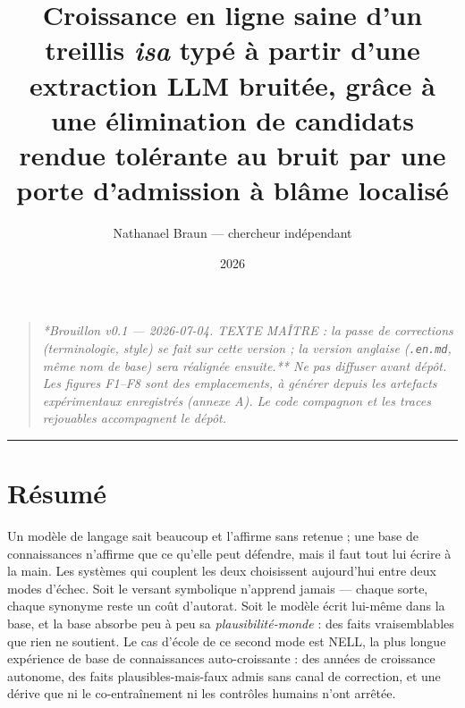 \documentclass[11pt]{article}
\title{\textbf{Croissance en ligne saine d'un treillis \emph{isa} typé à partir d'une extraction LLM bruitée, grâce à une élimination de candidats rendue tolérante au bruit par une porte d'admission à blâme localisé}}
\author{Nathanael Braun — chercheur indépendant}
\date{2026}
\begin{document}
\maketitle
\begin{quote}\itshape **Brouillon v0.1 — 2026-07-04. TEXTE MAÎTRE : la passe de corrections (terminologie, style) se fait sur cette version ; la version anglaise (\texttt{.en.md}, même nom de base) sera réalignée ensuite.** Ne pas diffuser avant dépôt. Les figures F1–F8 sont des emplacements, à générer depuis les artefacts expérimentaux enregistrés (annexe A). Le code compagnon et les traces rejouables accompagnent le dépôt.\end{quote}

\medskip\hrule\medskip

\section*{Résumé}

Un modèle de langage sait beaucoup et l'affirme sans retenue ; une base de connaissances n'affirme que ce qu'elle peut défendre, mais il faut tout lui écrire à la main. Les systèmes qui couplent les deux choisissent aujourd'hui entre deux modes d'échec. Soit le versant symbolique n'apprend jamais — chaque sorte, chaque synonyme reste un coût d'autorat. Soit le modèle écrit lui-même dans la base, et la base absorbe peu à peu sa \emph{plausibilité-monde} : des faits vraisemblables que rien ne soutient. Le cas d'école de ce second mode est NELL, la plus longue expérience de base de connaissances auto-croissante : des années de croissance autonome, des faits plausibles-mais-faux admis sans canal de correction, et une dérive que ni le co-entraînement ni les contrôles humains n'ont arrêtée.
\end{document}
